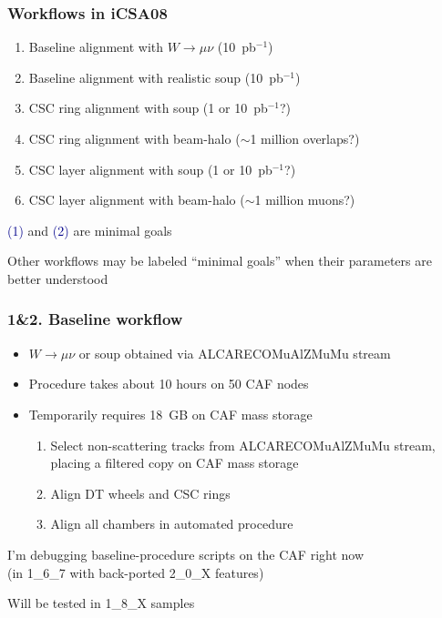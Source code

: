 \documentclass[compress]{beamer}
\begin{document}
\begin{frame}
\frametitle{Workflows in iCSA08}

\begin{enumerate}\setlength{\itemsep}{0.25 cm}
\item Baseline alignment with $W \to \mu\nu$ (10~pb$^{-1}$)
\item Baseline alignment with realistic soup (10~pb$^{-1}$)
\item CSC ring alignment with soup (1 or 10~pb$^{-1}$?)
\item CSC ring alignment with beam-halo ($\sim$1 million overlaps?)
\item CSC layer alignment with soup (1 or 10~pb$^{-1}$?)
\item CSC layer alignment with beam-halo ($\sim$1 million muons?)
\end{enumerate}

\vfill
\textcolor{darkblue}{\small (1)} and \textcolor{darkblue}{\small (2)} are minimal goals

\vfill
Other workflows may be labeled ``minimal goals'' when their parameters are better understood
\end{frame}

\begin{frame}
\frametitle{1{\small \&}2. Baseline workflow}

\begin{itemize}\setlength{\itemsep}{0.5 cm}
\item $W\to\mu\nu$ or soup obtained via ALCARECOMuAlZMuMu stream
\item Procedure takes about 10 hours on 50 CAF nodes
\item Temporarily requires 18~GB on CAF mass storage

\vspace{0.1 cm}
\begin{enumerate}\setlength{\itemsep}{0.2 cm}
\item Select non-scattering tracks from ALCARECOMuAlZMuMu stream, placing a filtered copy on CAF mass storage
\item Align DT wheels and CSC rings
\item Align all chambers in automated procedure
\end{enumerate}
\end{itemize}

\vfill
I'm debugging baseline-procedure scripts on the CAF right now \\ (in 1\_6\_7 with back-ported 2\_0\_X features)

\vfill
Will be tested in 1\_8\_X samples
\end{frame}
\end{document}
